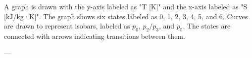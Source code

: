 A graph is drawn with the y-axis labeled as "T [K]" and the x-axis labeled as "S [kJ/kg·K]". The graph shows six states labeled as 0, 1, 2, 3, 4, 5, and 6. Curves are drawn to represent isobars, labeled as \( p_0 \), \( p_2/p_3 \), and \( p_5 \). The states are connected with arrows indicating transitions between them.

---